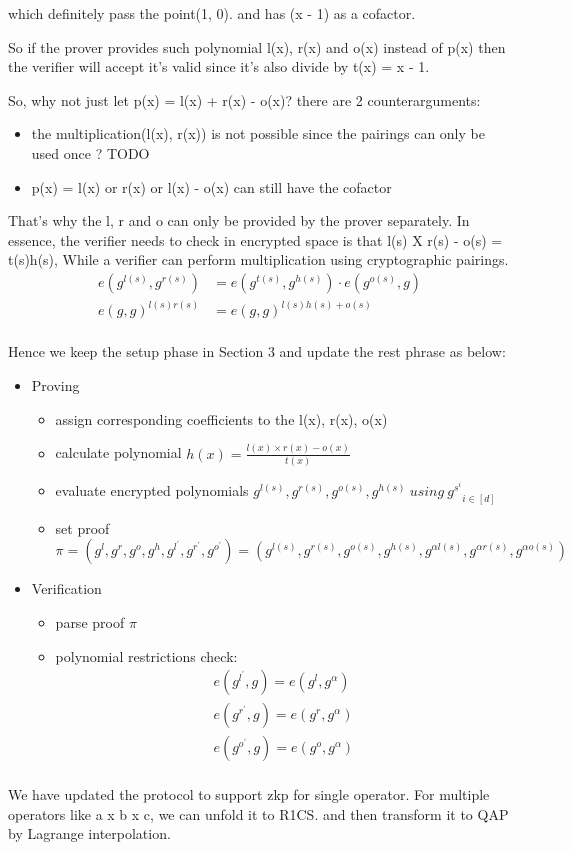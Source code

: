 \documentclass[a4paper,11pt]{article}
\begin{document}
which definitely pass the point(1, 0).  and has (x - 1) as a cofactor.

So if the prover provides such polynomial l(x), r(x) and o(x) instead of p(x) then the verifier will accept it's valid since it's also divide by t(x) = x - 1.

So, why not just let p(x) = l(x) + r(x) - o(x)? there are 2 counterarguments:
\begin{itemize}
\item the multiplication(l(x), r(x)) is not possible since the pairings can only be used once ? TODO
\item p(x) = l(x) or r(x)  or l(x) - o(x) can still have the cofactor
\end{itemize}

That's why the l, r and o can only be provided by the prover separately.  
In essence, the verifier needs to check in encrypted space is that l(s) X r(s) - o(s) = t(s)h(s), While a verifier can perform multiplication using cryptographic pairings. 
\begin{equation}
\begin{split}
e(g^{l(s)}, g^{r(s)})  &= e(g^{t(s)}, g^{h(s)}) \cdot e(g^{o(s)}, g) \\
e(g, g)^{l(s)r(s)} &= e(g, g)^{l(s)h(s) + o(s)}  \\
\end{split}
\end{equation}

Hence we keep the setup phase in Section 3 and update the rest phrase as below:
\begin{itemize}
\item Proving
\begin{itemize}
\item assign corresponding coefficients to the l(x), r(x), o(x) 
\item calculate polynomial $h(x) = \frac{l(x) \times r(x) - o(x)}{t(x)}$
\item evaluate encrypted polynomials $g^{l(s)}, g^{r(s)}, g^{o(s)}, g^{h(s)}\ using\ {g^{s^i}}_{i \in [d]}$
\item set proof $\pi = (g^l,g^r,g^o,g^h,g^{l^{'}},g^{r^{'}}, g^{o^{'}}) = (g^{l(s)},g^{r(s)},g^{o(s)},g^{h(s)},g^{\alpha l(s)},g^{\alpha r(s)}, g^{\alpha o(s)})$ 
\end{itemize}

\item Verification
\begin {itemize}
\item parse proof $\pi$
\item polynomial restrictions check:
\begin{displaymath}
\begin{split}
e(g^{l^{'}}, g) = e(g^l, g^{\alpha})  \\
e(g^{r^{'}}, g) = e(g^r, g^{\alpha}) \\
e(g^{o^{'}}, g) = e(g^o, g^{\alpha}) \\
\end{split}
\end{displaymath}
\end{itemize}
\end{itemize}

We have updated the protocol to support zkp for single operator. 
For multiple operators like a x b x c,  we can unfold it to R1CS.   and then transform it to QAP by Lagrange interpolation.
 
 
 
 



\end{document}
